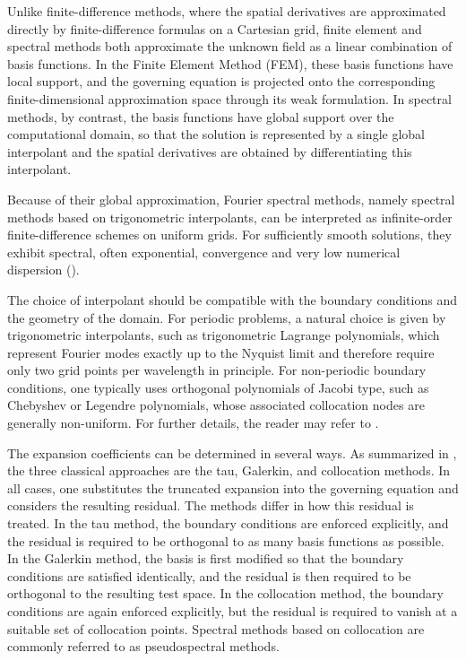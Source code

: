 \documentclass{Configuration_Files/PoliMi3i_thesis}
\begin{document}
 Unlike finite-difference methods, where the spatial derivatives are approximated directly by finite-difference formulas on a Cartesian grid, finite element and spectral methods both approximate the unknown field as a linear combination of basis functions. In the Finite Element Method (FEM), these basis functions have local support, and the governing equation is projected onto the corresponding finite-dimensional approximation space through its weak formulation. In spectral methods, by contrast, the basis functions have global support over the computational domain, so that the solution is represented by a single global interpolant and the spatial derivatives are obtained by differentiating this interpolant.

Because of their global approximation, Fourier spectral methods, namely spectral methods based on trigonometric interpolants, can be interpreted as infinite-order finite-difference schemes on uniform grids. For sufficiently smooth solutions, they exhibit spectral, often exponential, convergence and very low numerical dispersion (\cite{hesthaven_spectral_2007}).

The choice of interpolant should be compatible with the boundary conditions and the geometry of the domain. For periodic problems, a natural choice is given by trigonometric interpolants, such as trigonometric Lagrange polynomials, which represent Fourier modes exactly up to the Nyquist limit and therefore require only two grid points per wavelength in principle. For non-periodic boundary conditions, one typically uses orthogonal polynomials of Jacobi type, such as Chebyshev or Legendre polynomials, whose associated collocation nodes are generally non-uniform. For further details, the reader may refer to \cite{hesthaven_spectral_2007,fornberg_practical_1996}.

The expansion coefficients can be determined in several ways. As summarized in \cite{fornberg_practical_1996}, the three classical approaches are the tau, Galerkin, and collocation methods. In all cases, one substitutes the truncated expansion into the governing equation and considers the resulting residual. The methods differ in how this residual is treated. In the tau method, the boundary conditions are enforced explicitly, and the residual is required to be orthogonal to as many basis functions as possible. In the Galerkin method, the basis is first modified so that the boundary conditions are satisfied identically, and the residual is then required to be orthogonal to the resulting test space. In the collocation method, the boundary conditions are again enforced explicitly, but the residual is required to vanish at a suitable set of collocation points. Spectral methods based on collocation are commonly referred to as pseudospectral methods.
\end{document}
